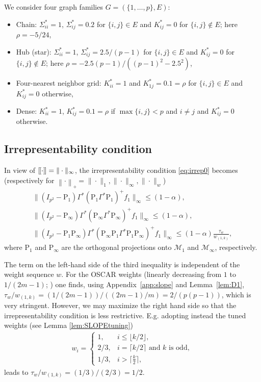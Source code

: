 \documentclass[12pt]{amsart}
\numberwithin{equation}{section}
\numberwithin{equation}{section}
\theoremstyle{definition}
\newcommand{\poly}[1]{\left\|#1\right\|_\diamond}
\newcommand{\PP}{\mathrm{P}}
\newcommand{\cnorm}[1]{[\mkern-1.5mu[#1]\mkern-1.5mu]}
\begin{document}
We consider four graph families $G=(\{1,\ldots,p\},E)$:
\begin{itemize}
	\item Chain: $\Sigma^{\ast}_{ii}=1$, $\Sigma^{\ast}_{ij} = 0.2$ for $\{i,j\}\in E$ and $K^\ast_{ij}=0$ for $\{i,j\}\notin E$; here $\rho=-5/24$,
	\item Hub (star): $\Sigma^\ast_{ii}=1$, $\Sigma^{\ast}_{ij} = 2.5/(p-1)$ for $\{i,j\}\in E$ and  $K^\ast_{ij}=0$ for $\{i,j\}\notin E$; here $\rho=-2.5(p-1)/((p-1)^2-2.5^2)$,
	\item Four-nearest neighbor grid: $K_{ii}^\ast=1$ and $K^\ast_{1j}=0.1=\rho$ for $\{i,j\}\in E$ and $K^\ast_{ij} = 0$ otherwise,
	\item Dense: $K^\ast_{ii}=1$, $K^\ast_{ij}=0.1=\rho$ if $\max\{i,j\}<p$ and $i\neq j$  and $K^\ast_{ij}=0$  otherwise. 
\end{itemize}




\subsection{Irrepresentability condition}
In view of $\cnorm{\cdot}=\|\cdot\|_\infty$, the irrepresentability condition \eqref{eq:irrep0} becomes (respectively for $\poly{\cdot}=\|\cdot\|_1, \|\cdot\|_\infty, \|\cdot\|_w$)
\begin{gather*}
	\| (I_{p^2}-\PP_1) \Gamma^\ast  (\PP_1\Gamma^\ast \PP_1)^+ f_1\|_\infty \leq (1-\alpha), \\
	\| (I_{p^2}-\PP_\infty) \Gamma^\ast  (\PP_\infty \Gamma^\ast \PP_\infty)^+  f_1 \|_\infty \leq (1-\alpha),\\
	\| (I_{p^2}-\PP_1 \PP_\infty) \Gamma^\ast  (\PP_\infty\PP_1 \Gamma^\ast \PP_1\PP_\infty)^+  f_1 \|_\infty \leq  (1-\alpha) \frac{\tau_w}{w_{(1,k)}},
\end{gather*}
where $\PP_1$ and $\PP_\infty$ are the orthogonal projections onto $\mathcal{M}_1 $ and $\mathcal{M}_\infty$, respectively. 

The term on the left-hand side of the third inequality is independent of the weight sequence $w$.  For the OSCAR weights (linearly decreasing from $1$ to $1/(2m-1)$; \citealp{OSCAR08}) one finds, using Appendix~\ref{app:slope} and Lemma~\ref{lem:D1},
$\tau_w/w_{(1,k)} = (1/(2m-1))/((2m-1)/m)= 2/(p(p-1))$, which is very stringent. However, we may maximize  the right hand side so that the irrepresentability condition is less restrictive. E.g. adopting instead the tuned weights (see Lemma \ref{lem:SLOPEtuning})
\begin{align}\label{eq:specialSLOPE}
w_i = \begin{cases}
    1, & i \leq \lfloor k/2\rfloor,\\
    2/3, & i = \lceil k/2\rceil \mbox{ and }k\mbox{ is odd}, \\
    1/3, & i > \lceil\frac{k}{2}\rceil,
\end{cases}
\end{align}
leads to $
\tau_w/w_{(1,k)}=(1/3)/(2/3)=1/2$.
\end{document}
